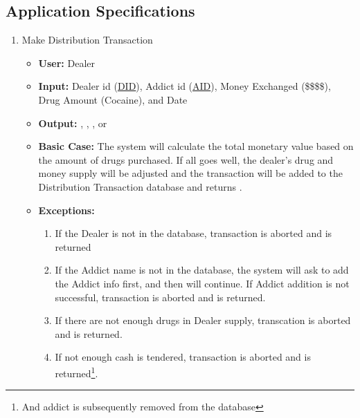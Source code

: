 \documentclass[11pt, oneside]{article}   	%
\theoremstyle{definition}
\theoremstyle{remark}
\begin{document}
\subsection{Application Specifications}
\begin{enumerate}

	\item Make Distribution Transaction
	\begin{itemize}
		\item \textbf{User:} Dealer
		\item \textbf{Input:} Dealer id (\underline{DID}), Addict id (\underline{AID}), Money Exchanged (\$\$\$\$), Drug Amount (Cocaine), and Date
		\item \textbf{Output:} , , ,  or 
		\item \textbf{Basic Case:} The system will calculate the total monetary value based on the amount of drugs purchased. If all goes well, the dealer's drug and money supply will be adjusted and the transaction will be added to the Distribution Transaction database and returns .
		\item \textbf{Exceptions:}
		\begin{enumerate}
			\item If the Dealer is not in the database, transaction is aborted and  is returned
			\item If the Addict name is not in the database, the system will ask to add the Addict info first, and then will continue. If Addict addition is not successful, transaction is aborted and  is returned.
			\item If there are not enough drugs in Dealer supply, transcation is aborted and  is returned.
			\item If not enough cash is tendered, transaction is aborted and  is returned\footnote{And addict is subsequently removed from the database}.
		\end{enumerate}
	\end{itemize}
		

\end{enumerate}
\end{document}

